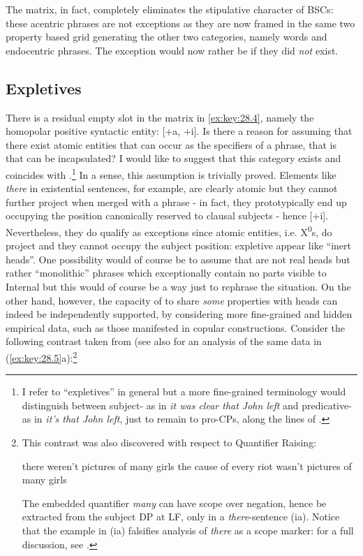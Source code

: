 \documentclass[output=paper]{langsci/langscibook}
\begin{document}
The matrix, in fact, completely eliminates the stipulative character of \glspl{BSC}:
these acentric phrases are not exceptions as they are now framed in the same
two property based grid generating the other two categories, namely words and
endocentric phrases. The exception would now rather be if they did \emph{not}
exist.

\subsection{Expletives}

There is a residual empty slot in the matrix in \eqref{ex:key:28.4}, namely the
homopolar positive syntactic entity: [+a, +i]. Is there a reason for assuming
that there exist atomic entities that can occur as the specifiers of a phrase,
that is that can be incapsulated? I would like to suggest that this category
exists and coincides with .\footnote{I refer to “expletives” in
    general but a more fine-grained terminology would distinguish between
    subject- as in \emph{it was clear that John left} and
    predicative- as in \emph{it's that John left}, just to remain to
    pro-CPs, along the lines of \citet{Moro1997}.} In a sense, this assumption
    is trivially proved. Elements like \emph{there} in  existential
    sentences, for example, are clearly atomic but they cannot further project
    when merged with a phrase - in fact, they  prototypically end up occupying
    the position canonically reserved to clausal subjects - hence [+i].
    Nevertheless, they do qualify as exceptions since atomic entities, i.e.
    X\textsuperscript{0}s, do project and they cannot occupy the subject
    position: expletive appear like “inert heads”. One possibility would of
    course be to assume that  are not real heads but rather
    “monolithic” phrases which exceptionally contain no parts visible to
    Internal  but this would of course be a way just to rephrase the
    situation.  On the other hand, however, the capacity of  to share
    \emph{some} properties with heads can indeed be independently supported, by
    considering more fine-grained and hidden empirical data, such as those
    manifested in copular constructions.  Consider the following contrast taken
    from \citealt{Moro1997} (see also \citealt{Stepanov2007} for an analysis of
    the same data in (\ref{ex:key:28.5}a):\footnote{This contrast was also
        discovered with respect to Quantifier Raising:

\begin{exe}
    \begin{xlist}
    \ex there weren't pictures of many girls
	\ex the cause of every riot wasn't pictures of many girls
    \end{xlist}
\end{exe}

The embedded quantifier \emph{many} can have scope over negation, hence be
extracted from the subject DP at \gls{LF}, only in a \emph{there}-sentence (ia).
Notice that the example in (ia) falsifies  analysis of
\emph{there} as a scope marker: for a full discussion, see \citet[Ch.\
2]{Moro1997}.}
\end{document}
